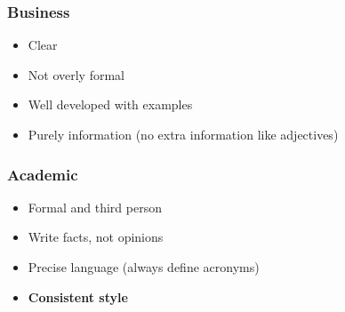 \subsubsection{Business}\label{ssub:business}

\begin{itemize}
	\item Clear
	\item Not overly formal
	\item Well developed with examples
	\item Purely information (no extra information like adjectives)
\end{itemize}

\subsubsection{Academic}\label{ssub:academic}

\begin{itemize}
	\item Formal and third person
	\item Write facts, not opinions
	\item Precise language (always define acronyms)
	\item \textbf{Consistent style}
\end{itemize}
